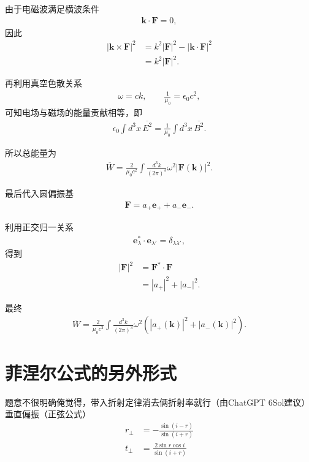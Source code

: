 \documentclass{article}
\begin{document}
由于电磁波满足横波条件
\begin{align}
    \mathbf k\cdot\mathbf F=0,
\end{align}
因此
\begin{align}
    |\mathbf k\times\mathbf F|^2
    &=k^2|\mathbf F|^2
    -|\mathbf k\cdot\mathbf F|^2\\
    &=k^2|\mathbf F|^2.
\end{align}

再利用真空色散关系
\begin{align}
    \omega=ck,\qquad
    \frac{1}{\mu_0}=\epsilon_0c^2,
\end{align}
可知电场与磁场的能量贡献相等，即
\begin{align}
    \epsilon_0\int d^3x\,\overline{E^2}
    =\frac{1}{\mu_0}
    \int d^3x\,\overline{B^2}.
\end{align}

所以总能量为
\begin{align}
    \overline W
    =\frac{2}{\mu_0c^2}
    \int\frac{d^3k}{(2\pi)^3}
    \omega^2|\mathbf F(\mathbf k)|^2.
\end{align}

最后代入圆偏振基
\begin{align}
    \mathbf F=a_+\mathbf e_++a_-\mathbf e_-.
\end{align}

利用正交归一关系
\begin{align}
    \mathbf e_\lambda^*
    \cdot\mathbf e_{\lambda'}
    =\delta_{\lambda\lambda'},
\end{align}
得到
\begin{align}
    |\mathbf F|^2
    &=\mathbf F^*\cdot\mathbf F\\
    &=|a_+|^2+|a_-|^2.
\end{align}

最终
\begin{align}
    \boxed{
    \overline W
    =\frac{2}{\mu_0c^2}
    \int\frac{d^3k}{(2\pi)^3}
    \omega^2
    \left(
    |a_+(\mathbf k)|^2
    +|a_-(\mathbf k)|^2
    \right)
    }.
\end{align}

\section{菲涅尔公式的另外形式}
题意不很明确俺觉得，带入折射定律消去俩折射率就行（由ChatGPT 6Sol建议）
垂直偏振（正弦公式）
\[
\boxed{
\begin{aligned}
r_\perp&=-\frac{\sin(i-r)}{\sin(i+r)}\\[6pt]
t_\perp&=\frac{2\sin r\cos i}{\sin(i+r)}
\end{aligned}
}
\]
\end{document}
